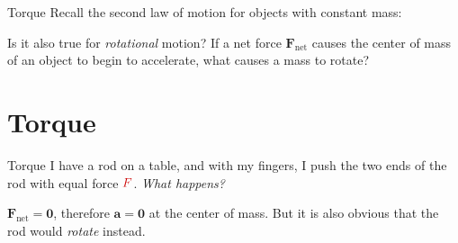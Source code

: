 \documentclass[12pt,compress,aspectratio=169]{beamer}
\begin{document}
\begin{frame}{Torque}
  Recall the second law of motion for objects with constant mass:
    

  \vspace{-.1in}Is it also true for \emph{rotational} motion? If a net force
  $\bm{F}_\text{net}$ causes the center of mass of an object to begin to
  accelerate, what causes a mass to rotate?
\end{frame}


\section{Torque}

\begin{frame}{Torque}
  I have a rod on a table, and with my fingers, I push the two ends of the rod
  with equal force $\textcolor{red!80!black}{F}$. \emph{What happens?}
  \begin{center}
  \end{center}
  $\bm{F}_\text{net}=\bm{0}$, therefore $\bm{a}=\bm{0}$ at the center of mass.
  But it is also obvious that the rod would \emph{rotate} instead.
\end{frame}
\end{document}
